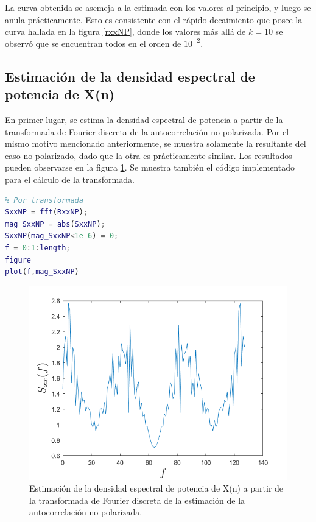 La curva obtenida se asemeja a la estimada con los valores al principio, y luego se anula prácticamente. Esto es consistente con el rápido decaimiento que posee la curva hallada en la figura \ref{rxxNP}, donde los valores más allá de $k=10$ se observó que se encuentran todos en el orden de $10^{-2}$.

\subsection{Estimaci\'on de la densidad espectral de potencia de X(n)}

En primer lugar, se estima la densidad espectral de potencia a partir de la transformada de Fourier discreta de la autocorrelación no polarizada. Por el mismo motivo mencionado anteriormente, se muestra solamente la resultante del caso no polarizado, dado que la otra es prácticamente similar. Los resultados pueden observarse en la figura \ref{densidadEs}. Se muestra también el código implementado para el cálculo de la transformada.

\begin{lstlisting}[language=Matlab, caption=EJ1.m]
%% ITEM 5
% Por transformada
SxxNP = fft(RxxNP);
mag_SxxNP = abs(SxxNP);
SxxNP(mag_SxxNP<1e-6) = 0;
f = 0:1:length;
figure
plot(f,mag_SxxNP)
\end{lstlisting}

\begin{figure}[H] %
\centering
\includegraphics[scale=0.45]{../EJ1/densidadEspectralFourierDiscNP}
\caption{Estimaci\'on de la densidad espectral de potencia  de X(n) a partir de la transformada de Fourier discreta de la estimaci\'on de la autocorrelación no polarizada.}
\label{densidadEs}
\end{figure}

